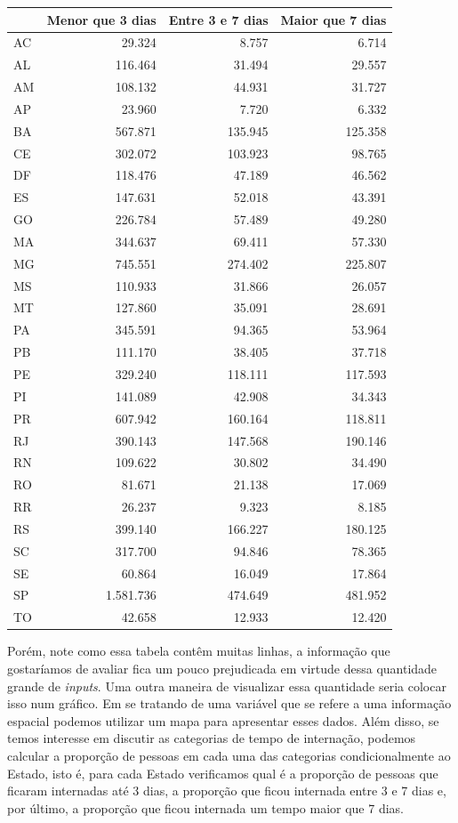 \documentclass[]{book}
\begin{document}
\begin{tabular}{lrrr}
\toprule
  & Menor que 3 dias & Entre 3 e 7 dias & Maior que 7 dias\\
\midrule
AC & 29.324 & 8.757 & 6.714\\
AL & 116.464 & 31.494 & 29.557\\
AM & 108.132 & 44.931 & 31.727\\
AP & 23.960 & 7.720 & 6.332\\
BA & 567.871 & 135.945 & 125.358\\
\addlinespace
CE & 302.072 & 103.923 & 98.765\\
DF & 118.476 & 47.189 & 46.562\\
ES & 147.631 & 52.018 & 43.391\\
GO & 226.784 & 57.489 & 49.280\\
MA & 344.637 & 69.411 & 57.330\\
\addlinespace
MG & 745.551 & 274.402 & 225.807\\
MS & 110.933 & 31.866 & 26.057\\
MT & 127.860 & 35.091 & 28.691\\
PA & 345.591 & 94.365 & 53.964\\
PB & 111.170 & 38.405 & 37.718\\
\addlinespace
PE & 329.240 & 118.111 & 117.593\\
PI & 141.089 & 42.908 & 34.343\\
PR & 607.942 & 160.164 & 118.811\\
RJ & 390.143 & 147.568 & 190.146\\
RN & 109.622 & 30.802 & 34.490\\
\addlinespace
RO & 81.671 & 21.138 & 17.069\\
RR & 26.237 & 9.323 & 8.185\\
RS & 399.140 & 166.227 & 180.125\\
SC & 317.700 & 94.846 & 78.365\\
SE & 60.864 & 16.049 & 17.864\\
\addlinespace
SP & 1.581.736 & 474.649 & 481.952\\
TO & 42.658 & 12.933 & 12.420\\
\bottomrule
\end{tabular}

Porém, note como essa tabela contêm muitas linhas, a informação que gostaríamos de avaliar fica um pouco prejudicada em virtude dessa quantidade grande de \emph{inputs}. Uma outra maneira de visualizar essa quantidade seria colocar isso num gráfico. Em se tratando de uma variável que se refere a uma informação espacial podemos utilizar um mapa para apresentar esses dados. Além disso, se temos interesse em discutir as categorias de tempo de internação, podemos calcular a proporção de pessoas em cada uma das categorias condicionalmente ao Estado, isto é, para cada Estado verificamos qual é a proporção de pessoas que ficaram internadas até 3 dias, a proporção que ficou internada entre 3 e 7 dias e, por último, a proporção que ficou internada um tempo maior que 7 dias.
\end{document}
